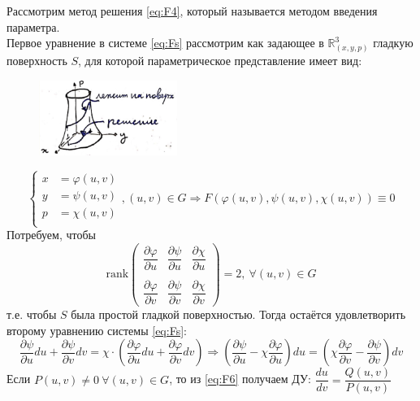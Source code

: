 \begin{proposition}
	Рассмотрим метод решения \eqref{eq:F4}, который называется методом введения параметра. \\
	Первое уравнение в системе \eqref{eq:Fs} рассмотрим как задающее в $\mathbb{ R }^3_{(x, y, p)} $ гладкую поверхность $S$, для которой параметрическое представление имеет вид:
	\begin{figure}[!h]
		\centering
		\includegraphics[width = 0.4\textwidth]{image_1.jpeg}
	\end{figure}	
	\[
	\left\{
	\begin{aligned}
		x &= \varphi(u, v)  \\
		y &= \psi(u, v) \\   
		p &= \chi(u, v) \\
	\end{aligned}
	\right. , (u, v) \in G
	\Rightarrow  F(\varphi(u, v), \psi(u, v), \chi(u, v)) \equiv 0                                               
	\]
	Потребуем, чтобы
	\[
		\text{rank}
		\begin{pmatrix}
			\dfrac{\partial\varphi}{\partial u} & \dfrac{\partial \psi}{\partial u} & \dfrac{\partial \chi}{\partial u} \\
			\\
			\dfrac{\partial\varphi}{\partial v} & \dfrac{\partial \psi}{\partial v} & \dfrac{\partial \chi}{\partial v}
		\end{pmatrix} = 2, \ \forall (u, v) \in G 
	\]
	т.е. чтобы $S$ была простой гладкой поверхностью.
	Тогда остаётся удовлетворить второму уравнению системы \eqref{eq:Fs}: \\
	\begin{equation} \label{eq:F6}
		\frac{\partial \psi}{\partial u} du + \frac{\partial \psi}{\partial v} dv = \chi \cdot \left(\frac{\partial \varphi}{\partial u}du + \frac{\partial \varphi}{\partial v}dv\right) \Rightarrow \left( \frac{\partial \psi}{\partial u} - \chi \frac{\partial \varphi}{\partial u} \right) du = \left(\chi \frac{\partial \varphi}{\partial v} - \frac{\partial \psi}{\partial v} \right) dv
	\end{equation}
	Если $ P(u, v) \neq 0 \ \forall (u, v) \in G$, то из \eqref{eq:F6} получаем ДУ: $ \dfrac{du}{dv} = \dfrac{Q(u, v)}{P(u, v)} $

\end{proposition}
